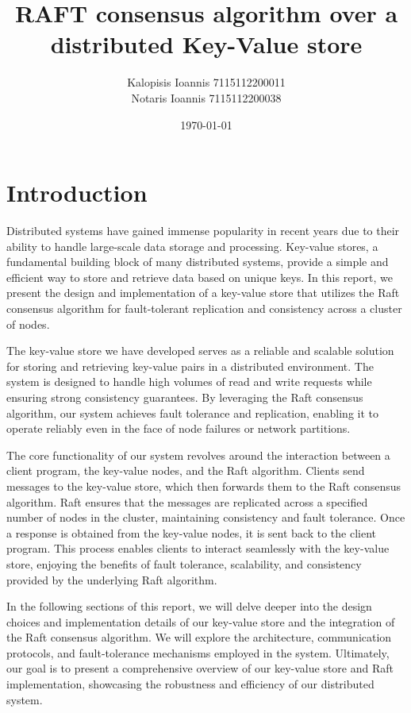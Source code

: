\documentclass{article}
\begin{document}
\title{RAFT consensus algorithm over a distributed Key-Value store}
\author{
Kalopisis Ioannis 7115112200011\\
Notaris  Ioannis 7115112200038}
\date{\today}


\maketitle
\thispagestyle{empty}
\newpage
\tableofcontents

\newpage

\section{Introduction}
Distributed systems have gained immense popularity in recent years due to their ability to
handle large-scale data storage and processing. Key-value stores, a fundamental building
block of many distributed systems, provide a simple and efficient way to store and retrieve
data based on unique keys. In this report, we present the design and implementation of a
key-value store that utilizes the Raft consensus algorithm for fault-tolerant replication
and consistency across a cluster of nodes.

The key-value store we have developed serves as a reliable and scalable solution for storing
and retrieving key-value pairs in a distributed environment. The system is designed to handle
high volumes of read and write requests while ensuring strong consistency guarantees.
By leveraging the Raft consensus algorithm, our system achieves fault tolerance and replication,
enabling it to operate reliably even in the face of node failures or network partitions.

The core functionality of our system revolves around the interaction between a client program,
the key-value nodes, and the Raft algorithm. Clients send messages to the key-value store,
which then forwards them to the Raft consensus algorithm. Raft ensures that the messages are
replicated across a specified number of nodes in the cluster, maintaining consistency and
fault tolerance. Once a response is obtained from the key-value nodes, it is sent back to the
client program. This process enables clients to interact seamlessly with the key-value store,
enjoying the benefits of fault tolerance, scalability, and consistency provided by the
underlying Raft algorithm.

In the following sections of this report, we will delve deeper into the design choices and
implementation details of our key-value store and the integration of the Raft consensus algorithm.
We will explore the architecture, communication protocols, and fault-tolerance mechanisms employed
in the system.  Ultimately, our goal is to present a comprehensive overview of our key-value
store and Raft implementation, showcasing the robustness and efficiency of our distributed system.
\end{document}
